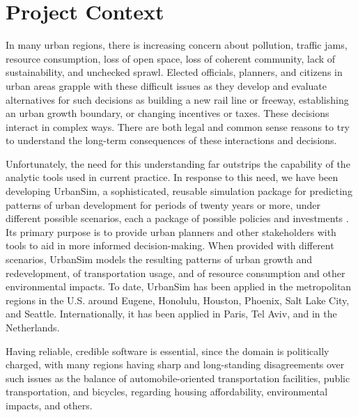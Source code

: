 
\section{Project Context}

In many urban regions, there is increasing concern 
about pollution, traffic jams,
resource consumption, loss of open space, loss of coherent community, lack of
sustainability, and unchecked sprawl.  Elected officials, planners, and
citizens in urban areas grapple with these difficult issues as they develop
and evaluate alternatives for such decisions as building a new rail line or
freeway, establishing an urban growth boundary, or changing incentives or
taxes.  These decisions interact in complex ways.  There are both legal and
common sense reasons to try to understand the long-term consequences of these
interactions and decisions.

Unfortunately, the need for this understanding far outstrips
the capability of the analytic tools used in current practice.  In response
to this need, we have been developing UrbanSim, a sophisticated, reusable
simulation package for predicting patterns of urban development for periods
of twenty years or more, under different possible scenarios, each a package
of possible policies and investments 
\cite{waddell-japa-2002,waddell-nse-2003}.  Its
primary purpose is to provide urban planners and other stakeholders with
tools to aid in more informed decision-making.  When provided with
different scenarios,
UrbanSim models the resulting patterns of urban growth and redevelopment,
of transportation usage, and of resource consumption and other
environmental impacts.  To date, UrbanSim has been applied in the
metropolitan regions in the U.S. around Eugene,
Honolulu, Houston, Phoenix, Salt Lake City, and Seattle.
Internationally, it has
been applied in Paris, Tel Aviv, and in the Netherlands.

Having reliable, credible software is essential, since
the domain is politically charged, with many regions having sharp and
long-standing disagreements over such issues as the balance of
automobile-oriented transportation facilities, public transportation, and
bicycles, regarding housing affordability, environmental impacts, and
others.  


